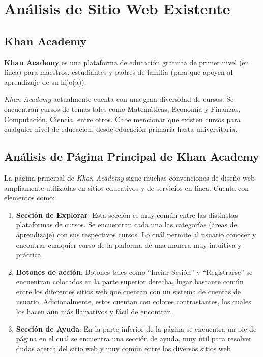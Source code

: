 	\clearpage
	\section{Análisis de Sitio Web Existente}

	\subsection{Khan Academy}

	\textbf{\href{https://es.khanacademy.org/profile/me/courses}{Khan Academy}} es una plataforma de educación gratuita de primer nivel (en línea) para maestros, estudiantes y padres de familia (para que apoyen al aprendizaje de su hijo(a)).

	\textit{Khan Academy} actualmente cuenta con una gran diversidad de cursos. Se encuentran cursos de temas tales como Matemáticas, Economía y Finanzas, Computación, Ciencia, entre otros. Cabe mencionar que existen cursos para cualquier nivel de educación, desde educación primaria hasta universitaria.

	\subsection{Análisis de Página Principal de Khan Academy}

	La página principal de \textit{Khan Academy} sigue muchas convenciones de diseño web ampliamente utilizadas en sitios educativos y de servicios en línea. Cuenta con elementos como:

	\begin{enumerate}
		\item \textbf{Sección de Explorar}: Esta sección es muy común entre las distinstas plataformas de cursos. Se encuentran cada una las categorías (áreas de aprendizaje) con sus respectivos cursos. Lo cuál permite al usuario conocer y encontrar cualquier curso de la plaforma de una manera muy intuitiva y práctica.

		\item \textbf{Botones de acción}: Botones tales como ``Inciar Sesión'' y ``Registrarse'' se encuentran colocados en la parte superior derecha, lugar bastante común entre los diferentes sitios web que cuentan con un sistema de cuentas de usuario. Adicionalmente, estos cuentan con colores contrastantes, los cuales los hacen aún más llamativos y fácil de encontrar.

		\item \textbf{Sección de Ayuda}: En la parte inferior de la página se encuentra un pie de página en el cual se encuentra una sección de ayuda, muy útil para resolver dudas acerca del sitio web y muy común entre los diversos sitios web
	\end{enumerate}


